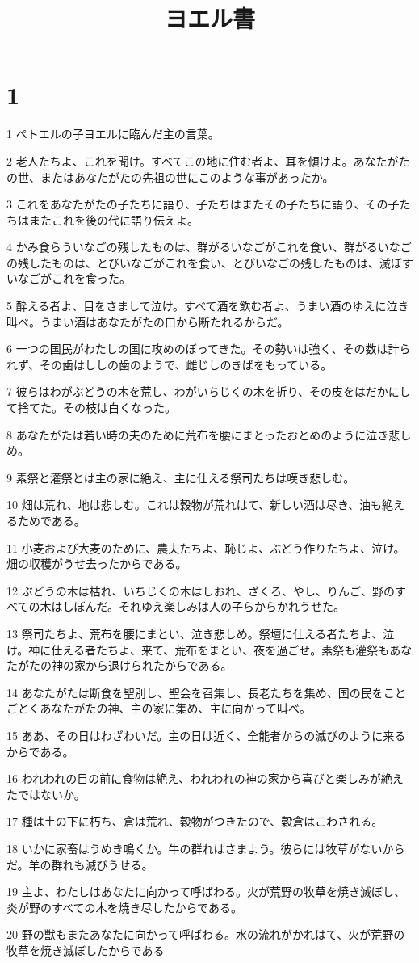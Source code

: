 

\title{ヨエル書}


\chapter{1}

\par 1 ペトエルの子ヨエルに臨んだ主の言葉。
\par 2 老人たちよ、これを聞け。すべてこの地に住む者よ、耳を傾けよ。あなたがたの世、またはあなたがたの先祖の世にこのような事があったか。
\par 3 これをあなたがたの子たちに語り、子たちはまたその子たちに語り、その子たちはまたこれを後の代に語り伝えよ。
\par 4 かみ食らういなごの残したものは、群がるいなごがこれを食い、群がるいなごの残したものは、とびいなごがこれを食い、とびいなごの残したものは、滅ぼすいなごがこれを食った。
\par 5 酔える者よ、目をさまして泣け。すべて酒を飲む者よ、うまい酒のゆえに泣き叫べ。うまい酒はあなたがたの口から断たれるからだ。
\par 6 一つの国民がわたしの国に攻めのぼってきた。その勢いは強く、その数は計られず、その歯はししの歯のようで、雌じしのきばをもっている。
\par 7 彼らはわがぶどうの木を荒し、わがいちじくの木を折り、その皮をはだかにして捨てた。その枝は白くなった。
\par 8 あなたがたは若い時の夫のために荒布を腰にまとったおとめのように泣き悲しめ。
\par 9 素祭と灌祭とは主の家に絶え、主に仕える祭司たちは嘆き悲しむ。
\par 10 畑は荒れ、地は悲しむ。これは穀物が荒れはて、新しい酒は尽き、油も絶えるためである。
\par 11 小麦および大麦のために、農夫たちよ、恥じよ、ぶどう作りたちよ、泣け。畑の収穫がうせ去ったからである。
\par 12 ぶどうの木は枯れ、いちじくの木はしおれ、ざくろ、やし、りんご、野のすべての木はしぼんだ。それゆえ楽しみは人の子らからかれうせた。
\par 13 祭司たちよ、荒布を腰にまとい、泣き悲しめ。祭壇に仕える者たちよ、泣け。神に仕える者たちよ、来て、荒布をまとい、夜を過ごせ。素祭も灌祭もあなたがたの神の家から退けられたからである。
\par 14 あなたがたは断食を聖別し、聖会を召集し、長老たちを集め、国の民をことごとくあなたがたの神、主の家に集め、主に向かって叫べ。
\par 15 ああ、その日はわざわいだ。主の日は近く、全能者からの滅びのように来るからである。
\par 16 われわれの目の前に食物は絶え、われわれの神の家から喜びと楽しみが絶えたではないか。
\par 17 種は土の下に朽ち、倉は荒れ、穀物がつきたので、穀倉はこわされる。
\par 18 いかに家畜はうめき鳴くか。牛の群れはさまよう。彼らには牧草がないからだ。羊の群れも滅びうせる。
\par 19 主よ、わたしはあなたに向かって呼ばわる。火が荒野の牧草を焼き滅ぼし、炎が野のすべての木を焼き尽したからである。
\par 20 野の獣もまたあなたに向かって呼ばわる。水の流れがかれはて、火が荒野の牧草を焼き滅ぼしたからである

